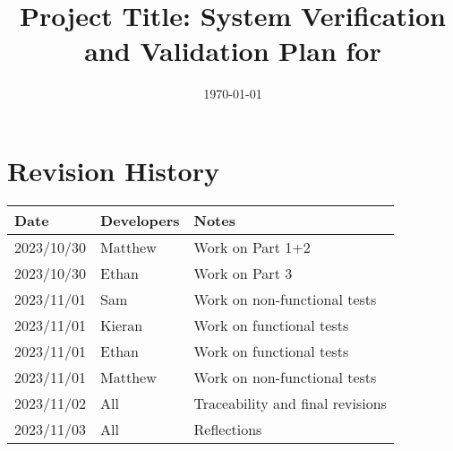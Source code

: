 \documentclass[12pt, titlepage]{article}
\begin{document}
\title{Project Title: System Verification and Validation Plan for \progname{}} 
\author{\authname}
\date{\today}
	
\maketitle


\section*{Revision History}

\begin{tabularx}{\textwidth}{p{3cm}p{2cm}X}
\toprule {\bf Date} & {\bf Developers} & {\bf Notes}\\
\midrule
2023/10/30 & Matthew & Work on Part 1+2\\
2023/10/30 & Ethan & Work on Part 3\\
2023/11/01 & Sam & Work on non-functional tests\\
2023/11/01 & Kieran & Work on functional tests\\
2023/11/01 & Ethan & Work on functional tests\\
2023/11/01 & Matthew & Work on non-functional tests\\
2023/11/02 & All & Traceability and final revisions\\
2023/11/03 & All & Reflections\\
\bottomrule
\end{tabularx}

~\\

\end{document}
